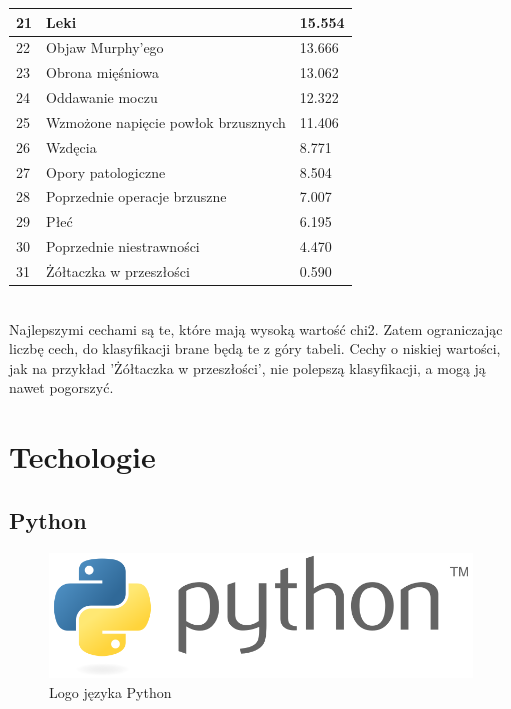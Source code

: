 \documentclass{report}
\begin{document}
\begin{tabular}{|l|l|l|}
        \hline 21 & Leki & 15.554 \\
        \hline 22 & Objaw Murphy'ego & 13.666 \\
        \hline 23 & Obrona mięśniowa & 13.062 \\
        \hline 24 & Oddawanie moczu & 12.322 \\
        \hline 25 & Wzmożone napięcie powłok brzusznych & 11.406 \\
        \hline 26 & Wzdęcia & 8.771 \\
        \hline 27 & Opory patologiczne & 8.504 \\
        \hline 28 & Poprzednie operacje brzuszne & 7.007 \\
        \hline 29 & Płeć & 6.195 \\
        \hline 30 & Poprzednie niestrawności & 4.470 \\
        \hline 31 & Żółtaczka w przeszłości & 0.590 \\
        \hline

    \end{tabular} \\

    Najlepszymi cechami są te, które mają wysoką wartość chi2.
    Zatem ograniczając liczbę cech, do klasyfikacji brane będą te z góry tabeli.
    Cechy o niskiej wartości, jak na przykład 'Żółtaczka w przeszłości', nie polepszą klasyfikacji, a mogą ją nawet pogorszyć.

    \chapter{Techologie}

    \section{Python}

    \begin{figure}
        \centering
        \includegraphics[scale=0.4]{./img/python-logo.png}
        \caption{Logo języka Python}
    \end{figure}
\end{document}
